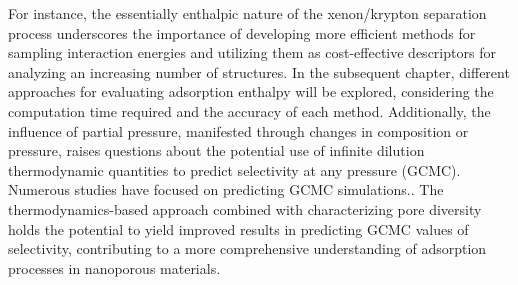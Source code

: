 \documentclass[main.tex]{subfiles}
\begin{document}
For instance, the essentially enthalpic nature of the xenon/krypton separation process underscores the importance of developing more efficient methods for sampling interaction energies and utilizing them as cost-effective descriptors for analyzing an increasing number of structures. In the subsequent chapter, different approaches for evaluating adsorption enthalpy will be explored, considering the computation time required and the accuracy of each method. Additionally, the influence of partial pressure, manifested through changes in composition or pressure, raises questions about the potential use of infinite dilution thermodynamic quantities to predict selectivity at any pressure (GCMC). Numerous studies have focused on predicting GCMC simulations.\autocite{Simon_2015,Shi_2023,Kang_2023,Li_2023}. The thermodynamics-based approach combined with characterizing pore diversity holds the potential to yield improved results in predicting GCMC values of selectivity, contributing to a more comprehensive understanding of adsorption processes in nanoporous materials.


\OnlyInSubfile{\printglobalbibliography}
\end{document}
